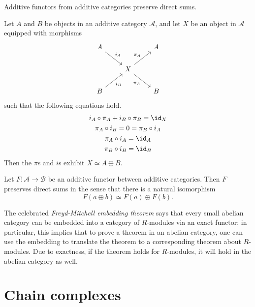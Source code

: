 \documentclass[main.tex]{subfiles}
\begin{document}
Additive functors from additive categories preserve direct sums.
\begin{lemma}
  \label{lemma:conditions_for_direct_sum}
  Let $A$ and $B$ be objects in an additive category $\mathcal{A}$, and let $X$ be an object in $\mathcal{A}$ equipped with morphisms
  \begin{equation*}
    \begin{tikzcd}
      A
      \arrow[dr, "i_{A}"]
      && A
      \\
      & X
      \arrow[ur, "\pi_{A}"]
      \arrow[dr, swap, "\pi_{A}"]
      \\
      B
      \arrow[ur, swap, "i_{B}"]
      && B
    \end{tikzcd}
  \end{equation*}
  such that the following equations hold.
  \begin{gather*}
    i_{A} \circ \pi_{A} + i_{B} \circ \pi_{B} = \id_{X} \\
    \pi_{A} \circ i_{B} = 0 = \pi_{B} \circ i_{A} \\
    \pi_{A} \circ i_{A} = \id_{A} \\
    \pi_{B} \circ i_{B} = \id_{B} \\
  \end{gather*}
  Then the $\pi$s and $i$s exhibit $X \simeq A \oplus B$.
\end{lemma}

\begin{corollary}
  Let $F\colon \mathcal{A} \to \mathcal{B}$ be an additive functor between additive categories. Then $F$ preserves direct sums in the sense that there is a natural isomorphism
  \begin{equation*}
    F(a \oplus b) \simeq F(a) \oplus F(b).
  \end{equation*}
\end{corollary}

The celebrated \emph{Freyd-Mitchell embedding theorem} says that every small abelian category can be embedded into a category of $R$-modules via an exact functor; in particular, this implies that to prove a theorem in an abelian category, one can use the embedding to translate the theorem to a corresponding theorem about $R$-modules. Due to exactness, if the theorem holds for $R$-modules, it will hold in the abelian category as well.

\section{Chain complexes}
\label{ssc:chain_complexes}
\end{document}
